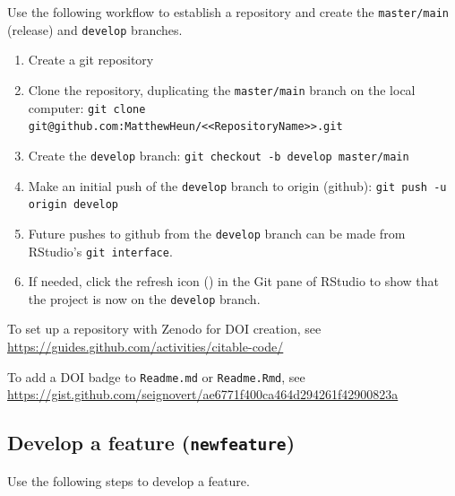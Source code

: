 \documentclass{article}
\begin{document}
Use the following workflow to establish a repository and
create the \texttt{master/main} (release) and \texttt{develop} branches.
%
\begin{enumerate}

  \item Create a git repository

  \item Clone the repository, duplicating the \texttt{master/main} branch on the local computer:
  		\texttt{git clone git@github.com:MatthewHeun/<<RepositoryName>>.git}

  \item Create the \texttt{develop} branch:
  		\texttt{git checkout -b develop master/main}

  \item Make an initial push of the \texttt{develop} branch to origin (github):
        \texttt{git push -u origin develop}

  \item Future pushes to github from the \texttt{develop} branch
  		can be made from RStudio's \texttt{git interface}.

  \item If needed, click the refresh icon
  		() in the Git pane of RStudio to
  		show that the project is now on the \texttt{develop} branch.

\end{enumerate}

To set up a repository with Zenodo for DOI creation, see
\url{https://guides.github.com/activities/citable-code/}

To add a DOI badge to \texttt{Readme.md} or \texttt{Readme.Rmd}, see
\url{https://gist.github.com/seignovert/ae6771f400ca464d294261f42900823a}


\subsection{Develop a feature (\texttt{newfeature})}
\label{sec:feature}

Use the following steps to develop a feature.
\end{document}
